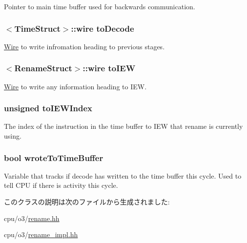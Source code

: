 \label{classDefaultRename_a83f9ee976e732665aeb08dbc19acfd45}
Pointer to main time buffer used for backwards communication. \hypertarget{classDefaultRename_aeb2f0e9b4602def9a8a57f7e3e12cf27}{
\subsubsection[{toDecode}]{$<${\bf TimeStruct}$>$::wire {\bf toDecode}}}
\label{classDefaultRename_aeb2f0e9b4602def9a8a57f7e3e12cf27}
\hyperlink{classWire}{Wire} to write infromation heading to previous stages. \hypertarget{classDefaultRename_a20add800a4fdb85a3d370265f248a006}{
\subsubsection[{toIEW}]{$<${\bf RenameStruct}$>$::wire {\bf toIEW}}}
\label{classDefaultRename_a20add800a4fdb85a3d370265f248a006}
\hyperlink{classWire}{Wire} to write any information heading to IEW. \hypertarget{classDefaultRename_abb033b9572d00b4ffa5aca6c7fb51427}{
\subsubsection[{toIEWIndex}]{\setlength{\rightskip}{0pt plus 5cm}unsigned {\bf toIEWIndex}}}
\label{classDefaultRename_abb033b9572d00b4ffa5aca6c7fb51427}
The index of the instruction in the time buffer to IEW that rename is currently using. \hypertarget{classDefaultRename_a2c7e870d4babdac0dc91fc7ffabd0f3d}{
\subsubsection[{wroteToTimeBuffer}]{\setlength{\rightskip}{0pt plus 5cm}bool {\bf wroteToTimeBuffer}}}
\label{classDefaultRename_a2c7e870d4babdac0dc91fc7ffabd0f3d}
Variable that tracks if decode has written to the time buffer this cycle. Used to tell CPU if there is activity this cycle. 

このクラスの説明は次のファイルから生成されました:\begin{DoxyCompactItemize}
\item 
cpu/o3/\hyperlink{rename_8hh}{rename.hh}\item 
cpu/o3/\hyperlink{rename__impl_8hh}{rename\_\-impl.hh}\end{DoxyCompactItemize}

